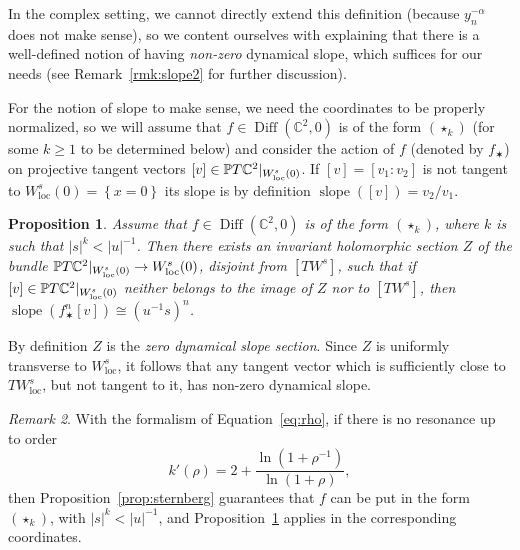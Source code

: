 \documentclass[11pt, oneside]{amsart}
\newcommand{\C}{\mathbb{C}}
\renewcommand{\P}{\mathbb{P}}
\newcommand{\set}[1]{\left\{#1\right\}}
\newcommand{\abs}[1]{\left\vert#1\right\vert}
\newcommand{\cd}{{\C^2}}
\newcommand{\rest}[1]{ \arrowvert_{#1}}
\newcommand{\loc}{{\mathrm{loc}}}
\newcommand{\inv}{^{-1}}
\DeclareMathOperator{\Diff}{Diff}
\DeclareMathOperator{\slope}{slope}
\newtheorem{prop}{Proposition} [section]
\theoremstyle{remark}
\newtheorem{rmk}[prop]{Remark}
\theoremstyle{definition}
\theoremstyle{theorem}
\begin{document}
In the complex setting, we cannot directly extend this definition (because $y_n^{-\alpha}$ does not make sense), 
so we content ourselves with explaining  that there is a well-defined notion of having \emph{non-zero} 
dynamical slope, which suffices  for our needs (see Remark~\ref{rmk:slope2} for   further discussion).   
 
For the notion of slope to make 
 sense, we need the coordinates to be properly normalized, so we will 
assume that $f\in \Diff(\C^2, 0)$ is of the form $(\star_k)$ (for some $k\geq 1$ to be determined below)
and consider the action 
of $f$ (denoted by $f_\varstar$)
on projective tangent vectors $[v]\in \P T\cd\rest{W^s_\loc(0)}$. If $[v] = [v_1:v_2]$ is not tangent 
to $W^s_\loc(0)  = \set{x=0}$ its slope is by definition $\slope([v]) = v_2/v_1$. 

\begin{prop}\label{prop:slope}
Assume that  $f\in \Diff(\C^2, 0)$ is  of the form $(\star_k)$, 
where $k$ is such that $\abs{s}^k< \abs{u}\inv$. 
Then there exists an invariant  holomorphic section $Z$  of the bundle 
  $\P T\C^2\rest{W^s_\loc(0)}\to W^s_\loc(0)$, disjoint from $[TW^s]$,
 such that if 
$[v]\in \P T\C^2\rest{W^s_\loc(0)}$  neither  belongs to the image of $Z$ nor to $[TW^s]$, then 
$\slope (f_\varstar^n [v]) \cong (u\inv  s)^n$. 
\end{prop}
  
By definition $Z$ is the \emph{zero dynamical slope section}. Since $Z$ is uniformly transverse to 
$W^s_\loc$, it follows that any tangent vector which is sufficiently close to $TW^s_\loc$, but not tangent to it, has non-zero dynamical slope. 

\begin{rmk}\label{rmk:slope}
With the formalism of Equation~\eqref{eq:rho}, if there is no resonance up to order 
\begin{equation}\label{eq:k'}
k'(\rho) = 2 + \frac{\ln(1+\rho\inv)}{\ln(1+\rho)}, \end{equation} then 
Proposition~\ref{prop:sternberg} guarantees that 
$f$ can be put in the form $(\star_k)$,  with  $\abs{s}^k< \abs{u}\inv$, and 
Proposition~\ref{prop:slope} applies in the corresponding  coordinates. 
\end{rmk}

 
\end{document}

